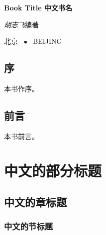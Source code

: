 \documentclass[a4paper,twoside]{ctexbook}
\begin{document}
\begin{titlepage}
  \centering
  \vspace*{25ex}
  { \textbf{Book Title 中文书名} \par}
  \vspace{10ex}
  { \textit{胡志飞}\quad{}编著 \par}
  \vfill
  {北京 ~$\bullet$ ~BEIJING}
\end{titlepage}
\thispagestyle{empty}


\frontmatter

\chapter*{序}

本书作序。


\chapter*{前言}

本书前言。


{
  \hypersetup{hidelinks}
  \tableofcontents
}

\lstlistoflistings


\mainmatter


\part{中文的部分标题}

\chapter{中文的章标题}

\hspace{.15\linewidth}\begin{minipage}[H]{.7\linewidth}
{
  \hypersetup{hidelinks}
  \startcontents[chapters]
}
\end{minipage}
\vspace{10ex}

\lipsum[3]

\clearpage

\section{中文的节标题}
\end{document}
